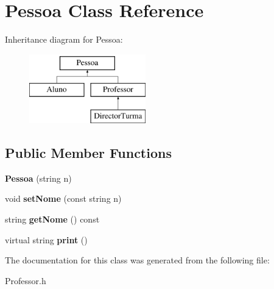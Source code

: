 \hypertarget{class_pessoa}{\section{Pessoa Class Reference}
\label{class_pessoa}
}
Inheritance diagram for Pessoa\-:\begin{figure}[H]
\begin{center}
\leavevmode
\includegraphics[height=3.000000cm]{class_pessoa}
\end{center}
\end{figure}
\subsection*{Public Member Functions}
\begin{DoxyCompactItemize}
\item 
\hypertarget{class_pessoa_a789675384a5b47a16c9f0a5a819aa1ff}{{\bfseries Pessoa} (string n)}\label{class_pessoa_a789675384a5b47a16c9f0a5a819aa1ff}

\item 
\hypertarget{class_pessoa_afe5128d96f8ef52b644746b9a45f63e7}{void {\bfseries set\-Nome} (const string n)}\label{class_pessoa_afe5128d96f8ef52b644746b9a45f63e7}

\item 
\hypertarget{class_pessoa_a8d4d2f40ba5634f49b0ce181fee7f0a7}{string {\bfseries get\-Nome} () const }\label{class_pessoa_a8d4d2f40ba5634f49b0ce181fee7f0a7}

\item 
\hypertarget{class_pessoa_a6ccbd5e11c47beb6de6650054caa5a79}{virtual string {\bfseries print} ()}\label{class_pessoa_a6ccbd5e11c47beb6de6650054caa5a79}

\end{DoxyCompactItemize}


The documentation for this class was generated from the following file\-:\begin{DoxyCompactItemize}
\item 
Professor.\-h\end{DoxyCompactItemize}
